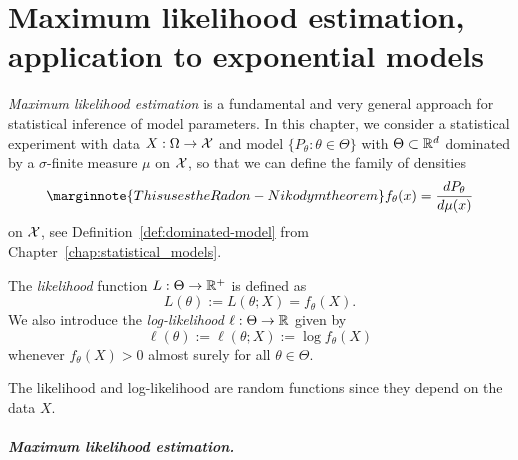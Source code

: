 
\setchapterpreamble[u]{\margintoc}
\chapter{Maximum likelihood estimation, application to exponential models}
\label{chap:maximum_likelihood_estimation}


\emph{Maximum likelihood estimation} is a fundamental and very general approach for statistical inference of model parameters.
In this chapter, we consider a statistical experiment with data $X : \Omega \rightarrow \operatorname{{\mathcal X}}$ and model $\{ P_\theta : \theta \in \Theta \}$ with $\Theta \subset \mathbb R^d$ dominated by a $\sigma$-finite measure $\mu$ on $\operatorname{{\mathcal X}}$, so that we can define the family of densities 
\begin{equation*}
	\marginnote{This uses the Radon-Nikodym theorem}
	f_\theta(x) = \frac{d P_\theta}{d \mu (x)} 
\end{equation*}
on $\operatorname{{\mathcal X}}$, see Definition~\ref{def:dominated-model} from Chapter~\ref{chap:statistical_models}.
\begin{definition}
	The \emph{likelihood} function $L : \Theta \rightarrow \mathbb R^+$ is defined as
	\begin{equation*}
		L(\theta) := L(\theta; X) = f_\theta(X).
	\end{equation*}
	We also introduce the \emph{log-likelihood} $\ell : \Theta \rightarrow \mathbb R$ given by
	\begin{equation*}
		\ell(\theta) := \ell(\theta; X) := \log f_\theta(X)
	\end{equation*}
	whenever $f_\theta(X) > 0$ almost surely for all $\theta \in \Theta$.
\end{definition}
The likelihood and log-likelihood are random functions since they depend on the data $X$.


\paragraph{Maximum likelihood estimation.} %


